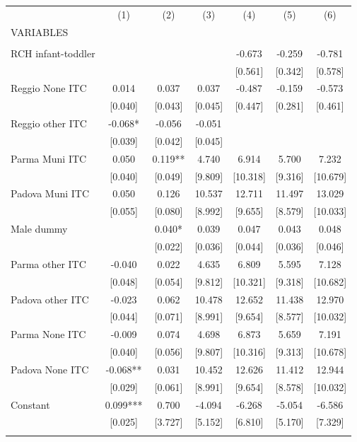 \begin{tabular}{lcccccc} \hline
 & (1) & (2) & (3) & (4) & (5) & (6) \\
VARIABLES &  &  &  &  &  &  \\ \hline
 &  &  &  &  &  &  \\
RCH infant-toddler &  &  &  & -0.673 & -0.259 & -0.781 \\
 &  &  &  & [0.561] & [0.342] & [0.578] \\
Reggio None ITC & 0.014 & 0.037 & 0.037 & -0.487 & -0.159 & -0.573 \\
 & [0.040] & [0.043] & [0.045] & [0.447] & [0.281] & [0.461] \\
Reggio other ITC & -0.068* & -0.056 & -0.051 &  &  &  \\
 & [0.039] & [0.042] & [0.045] &  &  &  \\
Parma Muni ITC & 0.050 & 0.119** & 4.740 & 6.914 & 5.700 & 7.232 \\
 & [0.040] & [0.049] & [9.809] & [10.318] & [9.316] & [10.679] \\
Padova Muni ITC & 0.050 & 0.126 & 10.537 & 12.711 & 11.497 & 13.029 \\
 & [0.055] & [0.080] & [8.992] & [9.655] & [8.579] & [10.033] \\
Male dummy &  & 0.040* & 0.039 & 0.047 & 0.043 & 0.048 \\
 &  & [0.022] & [0.036] & [0.044] & [0.036] & [0.046] \\
Parma other ITC & -0.040 & 0.022 & 4.635 & 6.809 & 5.595 & 7.128 \\
 & [0.048] & [0.054] & [9.812] & [10.321] & [9.318] & [10.682] \\
Padova other ITC & -0.023 & 0.062 & 10.478 & 12.652 & 11.438 & 12.970 \\
 & [0.044] & [0.071] & [8.991] & [9.654] & [8.577] & [10.032] \\
Parma None ITC & -0.009 & 0.074 & 4.698 & 6.873 & 5.659 & 7.191 \\
 & [0.040] & [0.056] & [9.807] & [10.316] & [9.313] & [10.678] \\
Padova None ITC & -0.068** & 0.031 & 10.452 & 12.626 & 11.412 & 12.944 \\
 & [0.029] & [0.061] & [8.991] & [9.654] & [8.578] & [10.032] \\
Constant & 0.099*** & 0.700 & -4.094 & -6.268 & -5.054 & -6.586 \\
 & [0.025] & [3.727] & [5.152] & [6.810] & [5.170] & [7.329] \\
 &  &  &  &  &  &  \\

\end{tabular}
